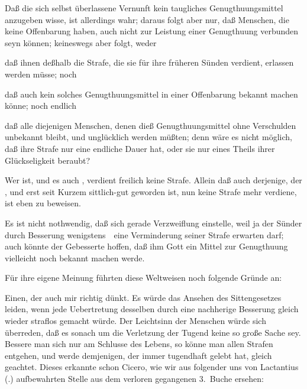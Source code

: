 \begin{aufza}
\begin{aufzb}
\item Daß die sich selbst überlassene Vernunft kein taugliches Genugthuungsmittel anzugeben wisse, ist allerdings wahr; daraus folgt aber nur, daß Menschen, die keine Offenbarung haben, auch nicht zur Leistung einer Genugthuung verbunden seyn können; keineswegs aber folgt, weder
\begin{aufzc}
\item daß ihnen deßhalb die Strafe, die sie für ihre früheren Sünden verdient, erlassen werden müsse; noch
\item daß auch  kein solches Genugthuungsmittel in einer Offenbarung bekannt machen könne; noch endlich
\item daß alle diejenigen Menschen, denen dieß Genugthuungsmittel ohne Verschulden unbekannt bleibt,  und  unglücklich werden müßten; denn wäre es nicht möglich, daß ihre Strafe nur eine endliche Dauer hat, oder sie nur eines Theils ihrer Glückseligkeit beraubt?
\end{aufzc}
\item Wer  ist, und es auch , verdient freilich keine Strafe. Allein daß auch derjenige, der , und erst seit Kurzem sittlich-gut geworden ist, nun keine Strafe mehr verdiene, ist eben zu beweisen.
\item Es ist nicht nothwendig, daß sich gerade Verzweiflung einstelle, weil ja der Sünder durch Besserung wenigstens~\ eine Verminderung seiner Strafe erwarten darf; auch könnte der Gebesserte hoffen, daß ihm Gott ein Mittel zur Genugthuung vielleicht noch bekannt machen werde.
\end{aufzb}
Für ihre eigene Meinung führten diese Weltweisen noch folgende Gründe an:
\begin{aufzb}
\item Einen, der auch mir richtig dünkt. Es würde das Ansehen des Sittengesetzes leiden, wenn jede Uebertretung desselben durch eine nachherige Besserung gleich wieder straflos gemacht würde. Der Leichtsinn der Menschen würde sich überreden, daß es sonach um die Verletzung der Tugend keine so große Sache sey. Bessere man sich nur am Schlusse des Lebens, so könne man allen Strafen entgehen, und werde demjenigen, der immer tugendhaft gelebt hat, gleich geachtet. Dieses erkannte schon Cicero, wie wir aus folgender uns von Lactantius (.) aufbewahrten Stelle aus dem verloren gegangenen 3.~Buche  ersehen: 

\end{aufzb}
\end{aufza}
